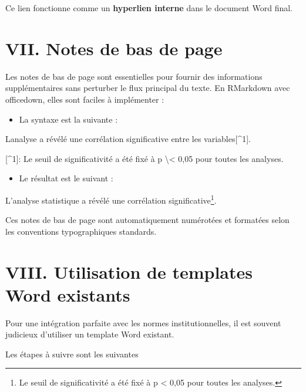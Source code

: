 \documentclass[
]{article}
\newenvironment{Shaded}{\begin{snugshade}}{\end{snugshade}}
\newcommand{\NormalTok}[1]{#1}
\providecommand{\tightlist}{%
  \setlength{\itemsep}{0pt}\setlength{\parskip}{0pt}}
\begin{document}
Ce lien fonctionne comme un \textbf{hyperlien interne} dans le document
Word final.

\section{VII. Notes de bas de page}\label{vii.-notes-de-bas-de-page}

Les notes de bas de page sont essentielles pour fournir des informations
supplémentaires sans perturber le flux principal du texte. En RMarkdown
avec officedown, elles sont faciles à implémenter :

\begin{itemize}
\tightlist
\item
  La syntaxe est la suivante :
\end{itemize}

\begin{Shaded}
\begin{Highlighting}[]
\NormalTok{L\textquotesingle{}analyse a révélé une corrélation significative entre les variables[\^{}1].}

\NormalTok{[\^{}1]: Le seuil de significativité a été fixé à p \textbackslash{}\textless{} 0,05 pour toutes les analyses.}
\end{Highlighting}
\end{Shaded}

\begin{itemize}
\tightlist
\item
  Le résultat est le suivant :
\end{itemize}

L'analyse statistique a révélé une corrélation significative\footnote{Le
  seuil de significativité a été fixé à p \textless{} 0,05 pour toutes
  les analyses.}.

Ces notes de bas de page sont automatiquement numérotées et formatées
selon les conventions typographiques standards.

\newpage

\section{VIII. Utilisation de templates Word
existants}\label{viii.-utilisation-de-templates-word-existants}

Pour une intégration parfaite avec les normes institutionnelles, il est
souvent judicieux d'utiliser un template Word existant.

Les étapes à suivre sont les suivantes
\end{document}
